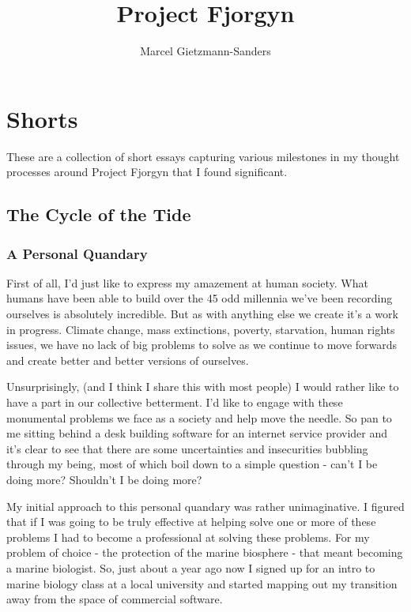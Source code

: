 \documentclass[10pt,a5paper]{book}
\title{Project Fjorgyn}
\author{Marcel Gietzmann-Sanders}
\begin{document}
\maketitle
\tableofcontents
\newpage
\chapter{Shorts}
These are a collection of short essays capturing various milestones in my thought processes around Project Fjorgyn that I found significant. 

\section{The Cycle of the Tide}
\subsection{A Personal Quandary}
First of all, I'd just like to express my amazement at human society. What humans have been able to build over the 45 odd millennia we've been recording ourselves is absolutely incredible. But as with anything else we create it's a work in progress. Climate change, mass extinctions, poverty, starvation, human rights issues, we have no lack of big problems to solve as we continue to move forwards and create better and better versions of ourselves. 

Unsurprisingly, (and I think I share this with most people) I would rather like to have a part in our collective betterment. I'd like to engage with these monumental problems we face as a society and help move the needle. So pan to me sitting behind a desk building software for an internet service provider and it's clear to see that there are some uncertainties and insecurities bubbling through my being, most of which boil down to a simple question - can't I be doing more? Shouldn't I be doing more?

My initial approach to this personal quandary was rather unimaginative. I figured that if I was going to be truly effective at helping solve one or more of these problems I had to become a professional at solving these problems. For my problem of choice - the protection of the marine biosphere - that meant becoming a marine biologist. So, just about a year ago now I signed up for an intro to marine biology class at a local university and started mapping out my transition away from the space of commercial software. 
\end{document}
